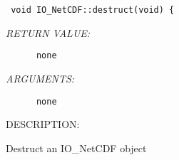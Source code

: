   
\begin{verbatim} void IO_NetCDF::destruct(void) {\end{verbatim}{\em RETURN VALUE:}
\begin{verbatim}      none\end{verbatim}{\em ARGUMENTS:}
\begin{verbatim}      none\end{verbatim}
{\sf DESCRIPTION:\\ }


        Destruct an IO_NetCDF object
  
\setlength{\parskip}{\oldparskip}
\setlength{\parindent}{\oldparindent}
\setlength{\baselineskip}{\oldbaselineskip}
